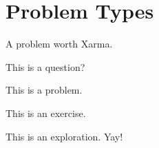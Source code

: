 \documentclass{ximera}
\begin{document}



\section{Problem Types}

\begin{xarmaBoost}
A problem worth Xarma.
\end{xarmaBoost}

\begin{question}
This is a question?
\end{question}

\begin{problem}
This is a problem.
\end{problem}

\begin{exercise}
This is an exercise.
\end{exercise}

\begin{exploration}
This is an exploration. Yay!
\end{exploration}
\end{document}
